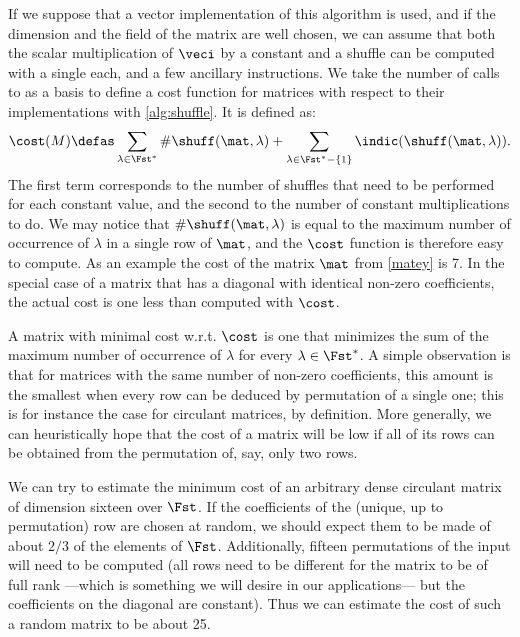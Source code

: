 If we suppose that a vector implementation of this algorithm is used, and if the dimension and the field of the matrix are well chosen,
we can assume that both the scalar multiplication of $\veci$ by a constant and a shuffle can be computed with a single
\pshufb{} each, and a few ancillary instructions. We take the number of calls to \pshufb as a basis to define a cost function for matrices with respect to their implementations with \autoref{alg:shuffle}.
It is defined as:
\[
\cost(M) \defas \sum_{\lambda \in \Fst^*}\#\shuff(\mat, \lambda) + \sum_{\lambda \in \Fst^*-\{1\}}\indic(\shuff(\mat, \lambda)).
\]
The first term corresponds to the number of shuffles that need to be performed for each constant value, and the second to the number
of constant multiplications to do.
We may notice that $\#\shuff(\mat, \lambda)$ is equal to the maximum number of occurrence of $\lambda$ in a single row of $\mat$, and the $\cost$ function
is therefore easy to compute. As an example the cost of the matrix $\mat$ from \autoref{matey} is 7. In the special case of a matrix that has a diagonal
with identical non-zero coefficients, the actual cost is one less than computed with $\cost$.

\medskip

A matrix with minimal cost w.r.t. $\cost$ is one that
minimizes the sum of the maximum number of occurrence of $\lambda$ for every $\lambda \in \Fst^*$.
A simple observation is that for matrices with the same number of non-zero coefficients, this amount is the smallest when every row can be deduced by permutation of a single one;
this is for instance the case for circulant matrices, by definition.
More generally, we can heuristically hope that the cost of a matrix will be low if all of its rows can be obtained from the permutation of, say, only two rows.

We can try to estimate the minimum cost of an arbitrary dense circulant matrix of dimension sixteen over $\Fst$.
If the coefficients of the (unique, up to permutation) row are chosen at random, we should expect them to be made of about $2/3$ of the elements of $\Fst$.
Additionally, fifteen permutations of the input will need to be computed (all rows need to be different for the matrix to be of full rank ---which is something we will
desire in our applications--- but the coefficients on the diagonal are constant).
Thus we can estimate the cost of such a random matrix to be about 25.

